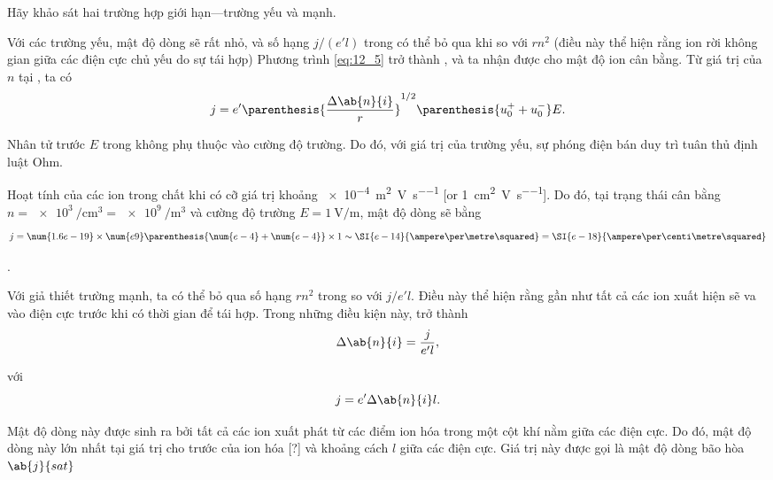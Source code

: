 Hãy khảo sát hai trường hợp giới hạn---trường yếu và mạnh.

Với các trường yếu, mật độ dòng sẽ rất nhỏ, và số hạng $j/(e'l)$ trong  có thể bỏ qua khi so với $rn^2$ (điều này thể hiện rằng ion rời không gian giữa các điện cực chủ yếu do sự tái hợp)
Phương trình \eqref{eq:12_5} trở thành , và ta nhận được  cho mật độ ion cân bằng.
Từ giá trị của $n$ tại , ta có
\begin{equation}\label{eq:12_7}
    j = e' \parenthesis{\frac{\Delta{\ab{n}{i}}}{r}}^{1/2} \parenthesis{u_0^+ + u_0^-} E.
\end{equation}

\noindent
Nhân tử trước $E$ trong  không phụ thuộc vào cường độ trường.
Do đó, với giá trị của trường yếu, sự phóng điện bán duy trì tuân thủ định luật Ohm.

Hoạt tính của các ion trong chất khi có cỡ giá trị khoảng \SI{e-4}{\metre\squared\per\volt\per\second} [or \SI{1}{\centi\metre\squared\per\volt\per\second}]. Do đó, tại trạng thái cân bằng  $n = \SI{e3}{\per\centi\metre\cubed} = \SI{e9}{\per\metre\cubed}$ và cường độ trường $E = \SI{1}{\volt\per\metre}$, mật độ dòng sẽ bằng
\begin{equation*}
    j = \num{1.6e-19} \times \num{e9} \parenthesis{\num{e-4}+\num{e-4}} \times 1 \sim \SI{e-14}{\ampere\per\metre\squared} = \SI{e-18}{\ampere\per\centi\metre\squared}
\end{equation*}

.

Với giả thiết trường mạnh, ta có thể bỏ qua số hạng $rn^2$ trong  so với $j/e'l$.
Điều này thể hiện rằng gần như tất cả các ion xuất hiện sẽ va vào điện cực trước khi có thời gian để tái hợp.
Trong những điều kiện này,  trở thành
\begin{equation*}
    \Delta{\ab{n}{i}} = \frac{j}{e' l},
\end{equation*}

\noindent
với
\begin{equation}\label{eq:12_8}
    j = e' \Delta{\ab{n}{i}} l.
\end{equation}

\noindent
Mật độ dòng này được sinh ra bởi tất cả các ion xuất phát từ các điểm ion hóa trong một cột khí nằm giữa các điện cực.
Do đó, mật độ dòng này lớn nhất tại giá trị cho trước của ion hóa [?] và khoảng cách $l$ giữa các điện cực.
Giá trị này được gọi là mật độ dòng bão hòa $\ab{j}{sat}$

